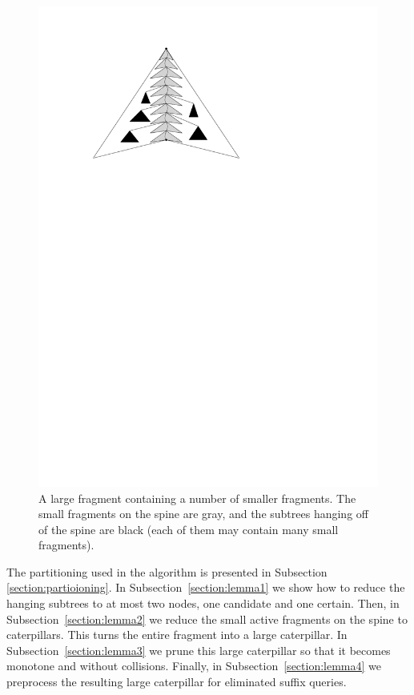 \documentclass[a4paper,UKenglish]{lipics-v2016}
\theoremstyle{plain}
\begin{document}
\begin{figure}[h]
\begin{center}
\includegraphics[scale=1]{refinement}
\end{center}
\caption{A large fragment containing a number of smaller fragments. The small fragments on the spine are gray, and the subtrees hanging off of the spine are black (each of them may contain many small fragments). %
\label{figure of small fragments inside a large fragment}}
\end{figure}


\noindent The partitioning used in the algorithm is presented in Subsection \ref{section:partioioning}. In Subsection~\ref{section:lemma1} we show how to reduce the hanging subtrees to at most two nodes, one candidate and one certain. Then, in Subsection~\ref{section:lemma2} we reduce the small active fragments on the spine to caterpillars. This turns the entire fragment into a large caterpillar. In Subsection~\ref{section:lemma3} we prune this large caterpillar so that it becomes monotone and without collisions. Finally, in Subsection~\ref{section:lemma4} we preprocess the resulting large caterpillar for eliminated suffix queries. 
\end{document}
